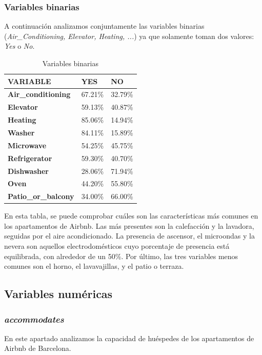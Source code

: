 \documentclass{article}
\begin{document}
\clearpage
\subsubsection{Variables binarias}
A continuación analizamos conjuntamente las variables binarias (\emph{Air\_Conditioning, Elevator, Heating, ...})  ya que solamente toman dos valores: \emph{Yes} o \emph{No}.

\begin{xltabular}{\linewidth}{ l | X | X}
  \caption{Variables binarias} 
 \label{table: vardescription}\\
 \hline \hline \hline

\textbf{\normalsize VARIABLE} & \textbf{\normalsize YES} & \textbf{\normalsize NO}  \\
 \hline 
\endhead

\textbf{Air\_conditioning} & 67.21\% & 32.79\% \\ \hline 
\textbf{Elevator} & 59.13\% & 40.87\% \\ \hline 
\textbf{Heating} & 85.06\% & 14.94\% \\ \hline 
\textbf{Washer} & 84.11\% & 15.89\% \\ \hline 
\textbf{Microwave} & 54.25\% & 45.75\%\\ \hline 
\textbf{Refrigerator} & 59.30\% & 40.70\% \\ \hline 
\textbf{Dishwasher} & 28.06\% & 71.94\% \\ \hline 
\textbf{Oven} & 44.20\% & 55.80\% \\ \hline 
\textbf{Patio\_or\_balcony} & 34.00\% & 66.00\% \\ \hline 
\end{xltabular}

En esta tabla, se puede comprobar cuáles son las características más comunes en los apartamentos de Airbnb. Las más presentes son la calefacción y la lavadora, seguidas por el aire acondicionado. La presencia de ascensor, el microondas y la nevera son aquellos electrodomésticos cuyo porcentaje de presencia  está equilibrada, con alrededor de un 50\%. Por último, las tres variables menos comunes son el horno, el lavavajillas, y el patio o terraza.

\clearpage
\subsection{Variables numéricas}
\subsubsection{\emph{accommodates}}
En este apartado analizamos la capacidad de huéspedes de los apartamentos de Airbnb de Barcelona.
\end{document}
